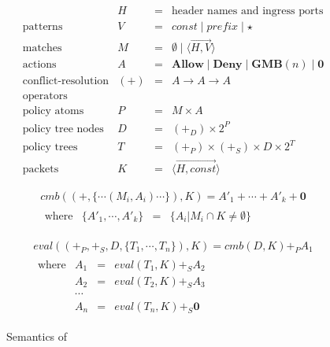 \begin{figure}

\begin{displaymath}
\begin{array}{lrcl}
& H & = & \textrm{header names and ingress ports} \\
\textrm{patterns} & V & = & \textit{const} \mid \textit{prefix} \mid \star \\
\textrm{matches} & M & = & 
  \emptyset \mid \langle \overrightarrow{H,V} \rangle \\
\textrm{actions} & A & = & \textbf{Allow} \mid \textbf{Deny} 
  \mid \textbf{GMB}(n) \mid \textbf{0} \\
\textrm{conflict-resolution} & (+)  & = & A \rightarrow A \rightarrow A \\
\textrm{operators} \\
\textrm{policy atoms} & P & = & M \times A \\
\textrm{policy tree nodes} & D & = & (+_D) \times 2^P \\
\textrm{policy trees} & T & = & (+_P) \times (+_S) \times D \times 2^{T} \\
\textrm{packets} & K & = & \langle \overrightarrow{H,\mathit{const}} \rangle
\end{array}
\end{displaymath}

\begin{displaymath}
\begin{array}{l}
\mathit{cmb}((+,\{ \cdots (M_i,A_i) \cdots \}), K) = 
  A'_1 + \cdots + A'_k + \textbf{0} \\
\begin{array}{lrcl}
\textrm{where} & \{ A'_1, \cdots, A'_k \} & = & \{ A_i | M_i \cap K \ne \emptyset \}
\end{array}
\end{array}
\end{displaymath}

\begin{displaymath}
\begin{array}{l}
\textit{eval}((+_P,+_S,D,\{ T_1,\cdots, T_n \}), K) = \textit{cmb}(D, K) +_P A_1 \\
\begin{array}{lrcl}
\textrm{where}
& A_1 & = & eval(T_1,K) +_S A_2 \\
& A_2 & = & eval(T_2,K) +_S A_3 \\
& \cdots \\
& A_n & = & eval(T_n,K) +_S \textbf{0}
\end{array}
\end{array}
\end{displaymath}

\caption[Caption for Semantics]{Semantics of \treelang \footnotemark }
\label{f:sharesem}
\end{figure}


